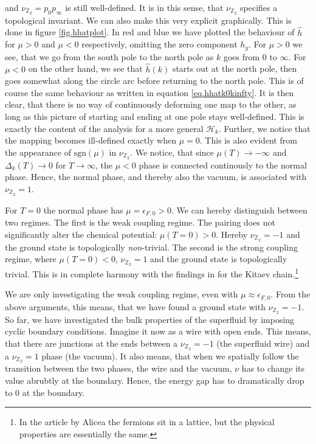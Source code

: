 and $\nu_{\mathbb{Z}_2} = p_0p_{\infty}$ is still well-defined. It is in this sense, that $\nu_{\mathbb{Z}_2}$ specifies a topological invariant. We can also make this very explicit graphically. This is done in figure \ref{fig.hhatplot}. In red and blue we have plotted the behaviour of $\hat{h}$ for $\mu > 0$  and $\mu < 0$ respectively, omitting the zero component $h_y$. For $\mu > 0$ we see, that we go from the south pole to the north pole as $k$ goes from $0$ to $\infty$. For $\mu < 0$ on the other hand, we see that $\hat{h}(k)$ starts out at the north pole, then goes somewhat along the circle arc before returning to the north pole. This is of course the same behaviour as written in equation \eqref{eq.hhatk0kinfty}. It is then clear, that there is no way of continuously deforming one map to the other, as long as this picture of starting and ending at one pole stays well-defined. This is exactly the content of the analysis for a more general $\mathcal{H}_k$. Further, we notice that the mapping becomes ill-defined exactly when $\mu = 0$. This is also evident from the appearance of $\text{sgn}(\mu)$ in $\nu_{\mathbb{Z}_2}$. We notice, that since $\mu(T) \to -\infty$ and $\Delta_k(T)\to 0$ for $T\to \infty$, the $\mu < 0$ phase is connected continously to the normal phase. Hence, the normal phase, and thereby also the vacuum, is associated with $\nu_{\mathbb{Z}_2} = 1$. 

For $T = 0$ the normal phase has $\mu = \epsilon_{F,0} > 0$. We can hereby distinguish between two regimes. The first is the weak coupling regime. The pairing does not significantly alter the chemical potential: $\mu(T=0) > 0$. Hereby $\nu_{\mathbb{Z}_2} = -1$ and the ground state is topologically \textit{non}-trivial. The second is the strong coupling regime, where $\mu(T = 0) < 0$, $\nu_{\mathbb{Z}_2} = 1$ and the ground state is topologically trivial. This is in complete harmony with the findings in \cite{Alicea} for the Kitaev chain.\footnote{In the article by Alicea the fermions sit in a lattice, but the physical properties are essentially the same.}

We are only investigating the weak coupling regime, even with $\mu \approx \epsilon_{F,0}$. From the above arguments, this means, that we have found a ground state with $\nu_{\mathbb{Z}_2} = -1$. So far, we have investigated the bulk properties of the superfluid by imposing cyclic boundary conditions. Imagine it now as a wire with open ends. This means, that there are junctions at the ends between a $\nu_{\mathbb{Z}_2} = -1$ (the superfluid wire) and a $\nu_{\mathbb{Z}_2} = 1$ phase (the vacuum). It also means, that when we spatially follow the transition between the two phases, the wire and the vacuum, $\nu$ has to change its value abrubtly at the boundary. Hence, the energy gap has to dramatically drop to $0$ at the boundary. 

